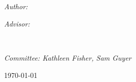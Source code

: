 \documentclass[
11pt, %
english, %
singlespacing, %
headsepline, %
]{MastersDoctoralThesis} %
\author{Marilyn \textsc{Sun}} %
\begin{document}
\frontmatter %

\pagestyle{plain} %


\begin{titlepage}
\begin{center}

\vspace*{.06\textheight}
{\scshape\LARGE \univname\par}\vspace{1.5cm} %

\HRule \\[0.4cm] %
{\huge \bfseries \ttitle\par}\vspace{0.4cm} %
\HRule \\[1.5cm] %
 
\begin{minipage}[t]{0.4\textwidth}
\begin{flushleft} \large
\emph{Author:}\\
\href{http://www.johnsmith.com}{\authorname} %
\end{flushleft}
\end{minipage}
\begin{minipage}[t]{0.4\textwidth}
\begin{flushright} \large
\emph{Advisor:} \\
\href{http://www.jamessmith.com}{\supname} %
\end{flushright}
\end{minipage}\\[7cm]
 
\vfill

\large \textit{Committee: Kathleen Fisher, Sam Guyer }\\[0.6cm]
\vfill

{\large \today}\\[4cm] %
 
\vfill
\end{center}
\end{titlepage}
\end{document}
